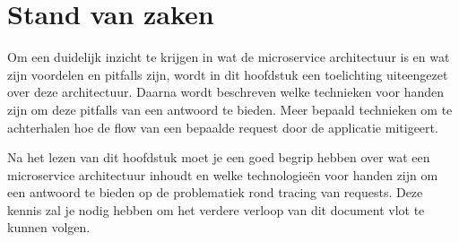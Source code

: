\chapter{Stand van zaken}
\label{ch:stand-van-zaken}






Om een duidelijk inzicht te krijgen in wat de microservice architectuur is en wat zijn voordelen en pitfalls zijn, wordt in dit hoofdstuk een toelichting uiteengezet over deze architectuur. Daarna wordt beschreven welke technieken voor handen zijn om deze pitfalls van een antwoord te bieden. Meer bepaald technieken om te achterhalen hoe de flow van een bepaalde request door de applicatie mitigeert. 

Na het lezen van dit hoofdstuk moet je een goed begrip hebben over wat een microservice architectuur inhoudt en welke technologieën voor handen zijn om een antwoord te bieden op de problematiek rond tracing van requests. Deze kennis zal je nodig hebben om het verdere verloop van dit document vlot te kunnen volgen.

